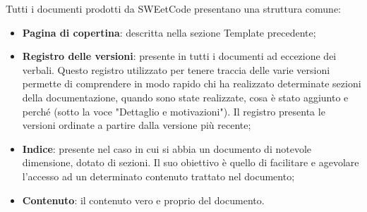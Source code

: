 \documentclass[10pt, a4paper]{article}
\begin{document}
    Tutti i documenti prodotti da SWEetCode presentano una struttura comune:
    \begin{itemize}
        \item \textbf{Pagina di copertina}: descritta nella sezione Template precedente;
        \item \textbf{Registro delle versioni}: presente in tutti i documenti ad eccezione dei verbali. Questo registro utilizzato per 
        tenere traccia delle varie versioni permette di comprendere in modo rapido chi ha realizzato determinate sezioni della 
        documentazione, quando sono state realizzate, cosa è stato aggiunto e perché (sotto la voce "Dettaglio e motivazioni"). Il registro 
        presenta le versioni ordinate a partire dalla versione più recente; 
        \item \textbf{Indice}: presente nel caso in cui si abbia un documento di notevole dimensione, dotato di sezioni. Il suo obiettivo è 
        quello di facilitare e agevolare l'accesso ad un determinato contenuto trattato nel documento;
        \item \textbf{Contenuto}: il contenuto vero e proprio del documento.
    \end{itemize}
    
\end{document}
